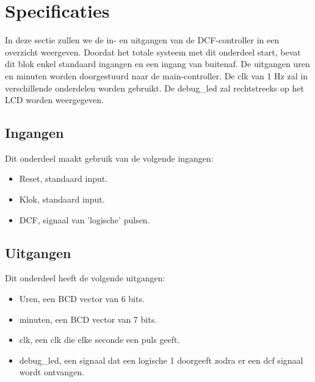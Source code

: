 \section{Specificaties}
In deze sectie zullen we de in- en uitgangen van de DCF-controller in een overzicht weergeven. Doordat het totale systeem met dit onderdeel start, bevat dit blok enkel standaard ingangen en een ingang van buitenaf. De uitgangen uren en minuten worden doorgestuurd naar de main-controller. De clk van 1 Hz zal in verschillende onderdelen worden gebruikt. De debug\_led zal rechtstreeks op het LCD worden weergegeven. 
\subsection{Ingangen}
Dit onderdeel maakt gebruik van de volgende ingangen: 

\begin{itemize}[nolistsep]
\item Reset, standaard input.
\item Klok, standaard input.
\item DCF, signaal van 'logische' pulsen.
\end{itemize}
\noindent

\subsection{Uitgangen}
Dit onderdeel heeft de volgende uitgangen:
\begin{itemize}[nolistsep]
\item Uren, een BCD vector van 6 bits.
\item minuten, een BCD vector van 7 bits.
\item clk, een clk die elke seconde een puls geeft.
\item debug\_led, een signaal dat een logische 1 doorgeeft zodra er een dcf signaal wordt ontvangen.
\end{itemize}


